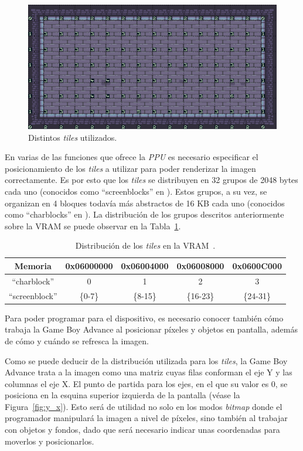 \begin{figure}[h]
	\centering
	\includegraphics[width=.8\textwidth]{capitulos/capitulo3/tiled_demo_4.png}
	\caption{Distintos \textit{tiles} utilizados.}
	\label{fig:tiled_demo_4}
\end{figure}

En varias de las funciones que ofrece la \textit{PPU} es necesario especificar el posicionamiento de los \textit{tiles} a utilizar para poder renderizar la imagen correctamente. Es por esto que los \textit{tiles} se distribuyen en 32 grupos de 2048 bytes cada uno (conocidos como ``screenblocks'' en \cite{bib:tonc}). Estos grupos, a su vez, se organizan en 4 bloques todavía más abstractos de 16 KB cada uno (conocidos como ``charblocks'' en \cite{bib:tonc}). La distribución de los grupos descritos anteriormente sobre la VRAM se puede observar en la Tabla~\ref{tab:dist_charblocks}.

\begin{table}[h]
	\centering
	\begin{tabular}{| c | c | c | c | c |}
		\hline
		\textbf{Memoria} & 0x06000000 & 0x06004000 & 0x06008000 & 0x0600C000 \\ \hline
		``charblock'' & 0 & 1 & 2 & 3 \\ \hline
		``screenblock'' & \{0-7\} & \{8-15\} & \{16-23\} & \{24-31\} \\ \hline
	\end{tabular}
	\caption[Distribución de los \textit{tiles} en la VRAM.]{Distribución de los \textit{tiles} en la VRAM~\cite{bib:tonc}.}
	\label{tab:dist_charblocks}
\end{table}
\FloatBarrier{}

Para poder programar para el dispositivo, es necesario conocer también cómo trabaja la Game Boy Advance al posicionar píxeles y objetos en pantalla, además de cómo y cuándo se refresca la imagen.

Como se puede deducir de la distribución utilizada para los \textit{tiles}, la Game Boy Advance trata a la imagen como una matriz cuyas filas conforman el eje Y y las columnas el eje X. El punto de partida para los ejes, en el que su valor es 0, se posiciona en la esquina superior izquierda de la pantalla (véase la Figura~\ref{fig:y_x}).  Esto será de utilidad no solo en los modos \textit{bitmap} donde el programador manipulará la imagen a nivel de píxeles, sino también al trabajar con objetos y fondos, dado que será necesario indicar unas coordenadas para moverlos y posicionarlos.

